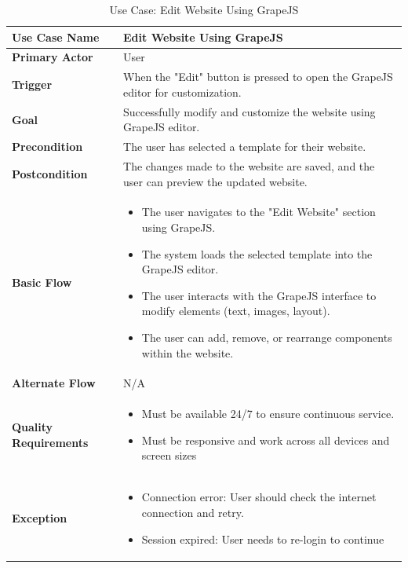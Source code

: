 \documentclass[12pt]{report}
\begin{document}
\clearpage
\begin{table}[h!]

\begin{tabular}{|p{3.5cm}|p{10cm}|}
\hline
\textbf{Use Case Name} & Edit Website Using GrapeJS \\ 
\hline
\textbf{Primary Actor} & User \\ 
\hline
\textbf{Trigger} & When the "Edit" button is pressed to open the GrapeJS editor for customization. \\ 
\hline
\textbf{Goal} & Successfully modify and customize the website using GrapeJS editor. \\ 
\hline
\textbf{Precondition} & The user has selected a template for their website. \\ 
\hline
\textbf{Postcondition} & The changes made to the website are saved, and the user can preview the updated website. \\ 
\hline
\textbf{Basic Flow} & 
\begin{itemize}
    \item The user navigates to the "Edit Website" section using GrapeJS.
    \item The system loads the selected template into the GrapeJS editor.
    \item The user interacts with the GrapeJS interface to modify elements (text, images, layout).
    \item The user can add, remove, or rearrange components within the website.
   
\end{itemize} \\ 
\hline
\textbf{Alternate Flow} & N/A \\ 
\hline
\textbf{Quality Requirements} & 
\begin{itemize}
    \item Must be available 24/7 to ensure continuous service.
    \item Must be responsive and work across all devices and screen sizes
\end{itemize} \\ 
\hline
\textbf{Exception} & 
\begin{itemize}
    \item Connection error: User should check the internet connection and retry.
    \item Session expired: User needs to re-login to continue
\end{itemize} \\ 
\hline
\end{tabular}

\caption{Use Case: Edit Website Using GrapeJS}
\end{table}
\end{document}
